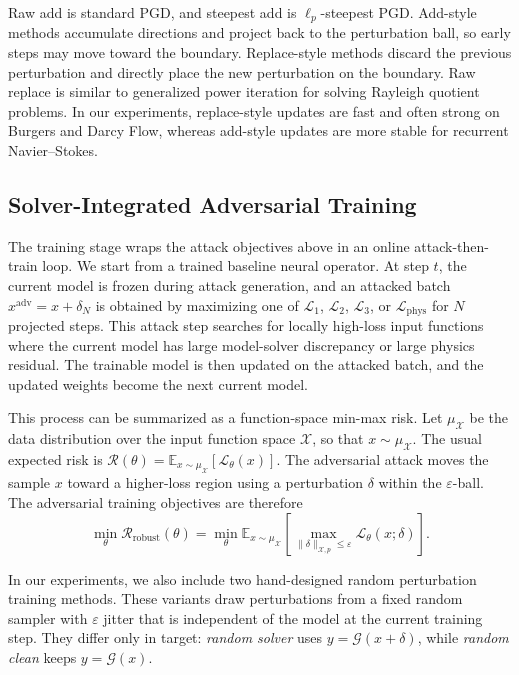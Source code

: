 \documentclass{article}
\begin{document}
Raw add is standard PGD, and steepest add is $\ell_p$-steepest PGD.
Add-style methods accumulate directions and project back
to the perturbation ball, so early steps may move toward the boundary.
Replace-style methods discard the previous perturbation and directly place the
new perturbation on the boundary. Raw replace is similar to generalized power
iteration for solving Rayleigh quotient problems.
In our experiments, replace-style updates are fast and often strong on Burgers
and Darcy Flow, whereas add-style updates are more stable for recurrent
Navier--Stokes.

\subsection{Solver-Integrated Adversarial Training}

The training stage wraps the attack objectives above in an online
attack-then-train loop. We start from a trained baseline neural operator. At
step $t$, the current model is frozen during attack generation, and an attacked
batch $x^{\mathrm{adv}}=x+\delta_N$ is obtained by maximizing one of
$\mathcal{L}_1$, $\mathcal{L}_2$, $\mathcal{L}_3$, or
$\mathcal{L}_{\mathrm{phys}}$ for $N$ projected steps. This attack step searches
for locally high-loss input functions where the current model has large
model-solver discrepancy or large physics residual. The trainable model is
then updated on the attacked batch, and the updated weights become the next
current model.

This process can be summarized as a function-space min-max risk.  Let
$\mu_{\mathcal X}$ be the data distribution over the input function space
$\mathcal X$, so that $x\sim\mu_{\mathcal X}$.  The usual expected risk is
\(\mathcal R(\theta)=
\mathbb E_{x\sim\mu_{\mathcal X}}[\mathcal L_\theta(x)]\). The adversarial
attack moves the sample \(x\) toward a higher-loss
region using a perturbation \(\delta\) within the \(\varepsilon\)-ball. The
adversarial training objectives are therefore
\[
  \min_\theta \mathcal R_{\mathrm{robust}}(\theta)
  =
  \min_\theta
  \mathbb E_{x\sim\mu_{\mathcal X}}
  \left[
    \max_{\|\delta\|_{\mathcal X,p}\le \varepsilon}
    \mathcal L_\theta(x;\delta)
  \right].
\]

In our experiments, we also include two hand-designed random perturbation
training methods. These variants draw perturbations from a fixed random sampler
with $\varepsilon$ jitter that is independent of the model at the current
training step. They differ only in target: \emph{random solver} uses
$y=\mathcal{G}(x+\delta)$, while \emph{random clean} keeps
$y=\mathcal{G}(x)$.
\end{document}
